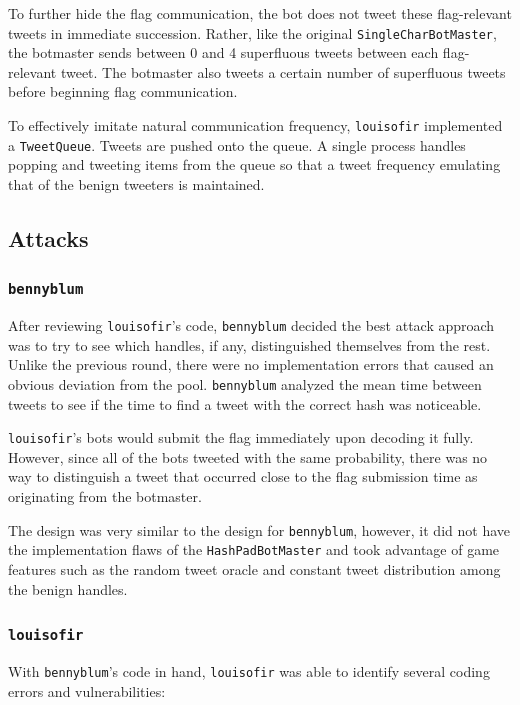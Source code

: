 \documentclass[11pt, oneside]{article} %
\numberwithin{equation}{section} %
\numberwithin{figure}{section} %
\numberwithin{table}{section} %
\renewcommand{\c}[1]{\texttt{#1}}
\newcommand{\teambb}{\c{bennyblum}}
\newcommand{\teamol}{\c{louisofir}}
\begin{document}
			To further hide the flag communication, the bot does not tweet these flag-relevant tweets in immediate succession. Rather, like the original \c{SingleCharBotMaster}, the botmaster sends between 0 and 4 superfluous tweets between each flag-relevant tweet. The botmaster also tweets a certain number of superfluous tweets before beginning flag communication.

			To effectively imitate natural communication frequency, \teamol{} implemented a \c{TweetQueue}. Tweets are pushed onto the queue. A single process handles popping and tweeting items from the queue so that a tweet frequency emulating that of the benign tweeters is maintained.
	
    \subsection{Attacks}

		\subsubsection{\teambb{}}

		After reviewing \teamol{}'s code, \teambb{} decided the best attack approach was to try to see which handles, if any, distinguished themselves from the rest. Unlike the previous round, there were no implementation errors that caused an obvious deviation from the pool. \teambb{} analyzed the mean time between tweets to see if the time to find a tweet with the correct hash was noticeable. 

		\teamol's bots would submit the flag immediately upon decoding it fully. However, since all of the bots tweeted with the same probability, there was no way to distinguish a tweet that occurred close to the flag submission time as originating from the botmaster. 

		The design was very similar to the design for \teambb{}, however, it did not have the implementation flaws of the \c{HashPadBotMaster} and took advantage of game features such as the random tweet oracle and constant tweet distribution among the benign handles.

		\subsubsection{\teamol{}}
			With \teambb{}'s code in hand, \teamol{} was able to identify several coding errors and vulnerabilities:  
			
\end{document}
